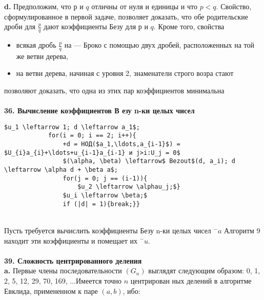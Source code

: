 \documentclass{../../template/mai_book}
\begin{document}
\hspace*{15pt}\textbf{d.} Предположим, что $р$ и $q$ отличны от нуля и единицы и что $p < q$.\linebreak
Свойство, сформулированное в первой задаче, позволяет доказать, что
обе родительские дроби для $\frac{p}{q}$ дают коэффициенты Безу для $р$ и $q$.
Кроме того, свойства
		\begin{itemize}
				\item всякая дробь $\frac{p}{q}$ на — Броко с помощью\linebreak
двух дробей, расположенных на той же ветви дерева,\\
				\item на ветви дерева, начиная с уровня 2, знаменатели строго возра­\linebreak
стают
\end{itemize}
позволяют доказать, что одна из этих пар коэффициентов минимальна\\
\\
\noindent\textbf{36. Вычисление коэффициентов В езу n-ки целых чисел}\\
\begin{lstlisting}[mathescape = true, caption = {Коэффициенты Безу}]
			$u_1 \leftarrow 1; d \leftarrow a_1$;
			for(i = 0; i == 2; i++){
				+d = НОД($a_1,\ldots,a_{i-1}$) = $U_{i}a_{i}+\ldots+u_{i-1}a_{i-1} и j>i:U_j = 0$
				$(\alpha, \beta) \leftarrow$ Bezout$(d, a_i); d \leftarrow \alpha d + \beta a$;
				for(j = 0; j == (i-1)){
					$u_2 \leftarrow \alphau_j;$}
				$u_i \leftarrow \beta;$
				if (|d| = 1){break;}}
\end{lstlisting}

\\
\newpage
\hspace*{15pt} Пусть требуется вычислить коэффициенты Безу n-ки целых чисел $^{-}a$\linebreak
Алгоритм 9 находит эти коэффициенты и помещает их $^{-}u$.\\
\\
\noindent\textbf{39. Сложность центрированного деления}\\

\hspace*{15pt}\textbf{a.} Первые члены последовательности $(G_n)$ выглядят следующим\linebreak
образом: 0, 1, 2, 5, 12, 29, 70, 169, ...Имеется точно $n$ центрирован­\linebreak
ных делений в алгоритме Евклида, примененном к паре $(a, b)$, ибо:
\end{document}
